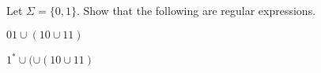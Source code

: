   Let $\Sigma = \{0,1\}$. Show that the following are regular expressions.
  \begin{tightlist}
    \item $0 1 \cup (1 0 \cup 1 1)$
    \item $1^* \cup (\cup (1 0 \cup 1 1)$
  \end{tightlist}
